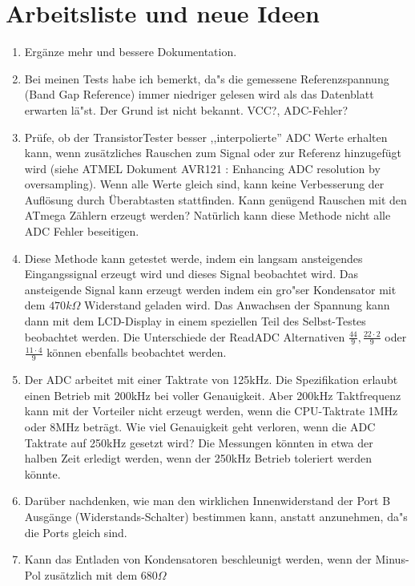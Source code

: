 
\chapter{Arbeitsliste und neue Ideen}
\label{sec:todo}

\begin{enumerate}
\item Erg\"anze mehr und bessere Dokumentation.
\item Bei meinen Tests habe ich bemerkt, da"s die gemessene Referenzspannung (Band Gap Reference) immer niedriger gelesen
wird als das Datenblatt erwarten l\"a"st.
Der Grund ist nicht bekannt. VCC?, ADC-Fehler?
\item Pr\"ufe, ob der TransistorTester besser ,,interpolierte''  ADC Werte erhalten kann, wenn zus\"atz\-liches Rauschen zum Signal
oder zur Referenz hinzugef\"ugt wird (siehe ATMEL Dokument AVR121 \cite{AVR121}: Enhancing ADC resolution by oversampling).
Wenn alle Werte gleich sind, kann keine Verbesserung der Aufl\"osung durch \"Uberabtasten stattfinden.
Kann gen\"ugend Rauschen mit den ATmega Z\"ahlern erzeugt werden?
Nat\"urlich kann diese Methode nicht alle ADC Fehler beseitigen.
\item Diese Methode kann getestet werde, indem ein langsam ansteigendes Eingangssignal erzeugt wird und dieses
Signal beobachtet wird.
Das ansteigende Signal kann erzeugt werden indem ein gro"ser Kondensator mit dem \(470k\Omega\) Widerstand geladen wird.
Das Anwachsen der Spannung kann dann mit dem LCD-Display in einem speziellen Teil des Selbst-Testes beobachtet werden.
Die Unterschiede der ReadADC Alternativen \(\frac{44}{9}, \frac{22\cdot2}{9}\) oder \(\frac{11\cdot4}{9}\) k\"onnen
ebenfalls beobachtet werden.
\item Der ADC arbeitet mit einer Taktrate von 125kHz. Die Spezifikation erlaubt einen Betrieb mit 200kHz bei voller Genauigkeit.
Aber 200kHz Taktfrequenz kann mit der Vorteiler nicht erzeugt werden, wenn die CPU-Taktrate 1MHz oder 8MHz betr\"agt.
Wie viel Genauigkeit geht verloren, wenn die ADC Taktrate auf 250kHz gesetzt wird?
Die Messungen k\"onnten in etwa der halben Zeit erledigt werden, wenn der 250kHz Betrieb toleriert werden k\"onnte.
\item Dar\"uber nachdenken, wie man den wirklichen Innenwiderstand der Port B Aus\-g\"an\-ge (Wider\-stands-Schal\-ter) bestimmen kann,
anstatt anzunehmen, da"s die Ports gleich sind.
\item Kann das Entladen von Kondensatoren beschleunigt werden, wenn der Minus-Pol zus\"atzlich mit dem \(680\Omega\) 

\end{enumerate}
